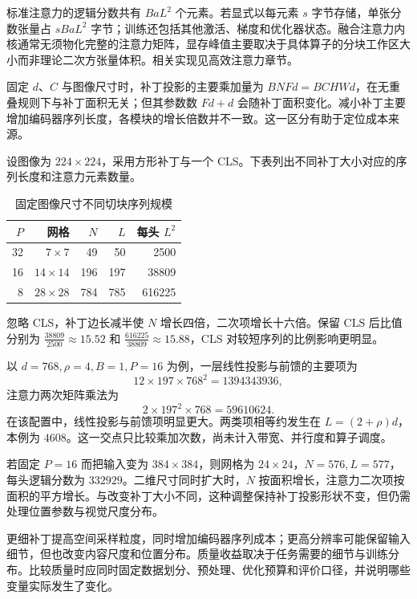 \documentclass[../textbook.tex]{subfiles}
\begin{document}
标准注意力的逻辑分数共有 $BaL^2$ 个元素。若显式以每元素 $s$ 字节存储，单张分数张量占 $sBaL^2$ 字节；训练还包括其他激活、梯度和优化器状态。融合注意力内核通常无须物化完整的注意力矩阵，显存峰值主要取决于具体算子的分块工作区大小而非理论二次方张量体积。相关实现见高效注意力章节。

固定 $d$、$C$ 与图像尺寸时，补丁投影的主要乘加量为 $BNFd=BCHWd$，在无重叠规则下与补丁面积无关；但其参数数 $Fd+d$ 会随补丁面积变化。减小补丁主要增加编码器序列长度，各模块的增长倍数并不一致。这一区分有助于定位成本来源。

\begin{example}[补丁大小与计算规模]

设图像为 $224\times224$，采用方形补丁与一个 CLS。下表列出不同补丁大小对应的序列长度和注意力元素数量。
\begin{table}[htbp]
\centering
\caption{固定图像尺寸不同切块序列规模}\label{tab:vision-transformer-resolution}
\begin{tabular}{rrrrr}
\toprule
$P$ & 网格 & $N$ & $L$ & 每头 $L^2$\\
\midrule
32 & $7\times7$ &49&50&2500\\
16 & $14\times14$ &196&197&38809\\
8 & $28\times28$ &784&785&616225\\
\bottomrule
\end{tabular}
\end{table}
忽略 CLS，补丁边长减半使 $N$ 增长四倍，二次项增长十六倍。保留 CLS 后比值分别为 $\frac{38809}{2500}\approx15.52$ 和 $\frac{616225}{38809}\approx15.88$，CLS 对较短序列的比例影响更明显。

以 $d=768,\rho=4,B=1,P=16$ 为例，一层线性投影与前馈的主要项为
\begin{equation*}
 12\times197\times768^2=1394343936,
\end{equation*}
注意力两次矩阵乘法为
\begin{equation*}
 2\times197^2\times768=59610624.
\end{equation*}
在该配置中，线性投影与前馈项明显更大。两类项相等约发生在 $L=(2+\rho)d$，本例为 $4608$。这一交点只比较乘加次数，尚未计入带宽、并行度和算子调度。

若固定 $P=16$ 而把输入变为 $384\times384$，则网格为 $24\times24$，$N=576,L=577$，每头逻辑分数为 $332929$。二维尺寸同时扩大时，$N$ 按面积增长，注意力二次项按面积的平方增长。与改变补丁大小不同，这种调整保持补丁投影形状不变，但仍需处理位置参数与视觉尺度分布。
\end{example}

\begin{note}
更细补丁提高空间采样粒度，同时增加编码器序列成本；更高分辨率可能保留输入细节，但也改变内容尺度和位置分布。质量收益取决于任务需要的细节与训练分布。比较质量时应同时固定数据划分、预处理、优化预算和评价口径，并说明哪些变量实际发生了变化。
\end{note}
\end{document}
